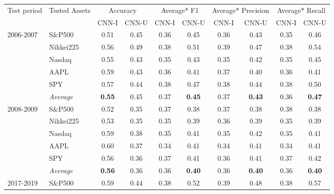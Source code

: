 \documentclass[11pt, a4paper]{article}
\begin{document}
\begin{table}[H]
\begin{tabular}{l|l|cc|cc|cc|cc}
\multicolumn{1}{m{1cm}|}{\multirow{2}{1cm}{Test period}} & \multicolumn{1}{m{1.5cm}|}{\multirow{2}{1.5cm}{Tested Assets}} & \multicolumn{2}{c|}{Accuracy} & \multicolumn{2}{c|}{Average* F1} & \multicolumn{2}{c|}{Average* Precision} & \multicolumn{2}{c}{Average* Recall}  \\
\cline{3-10}
&& CNN-I & CNN-U & CNN-I & CNN-U & CNN-I & CNN-U & CNN-I & CNN-U \\ \hline \hline
\multirow{6}{1cm}{2006-2007} & S\&P500          & 0.51          & 0.45 & 0.36 & 0.45          & 0.36 & 0.43          & 0.35 & 0.46          \\
& Nikkei225        & 0.56          & 0.49 & 0.38 & 0.51          & 0.39 & 0.47          & 0.38 & 0.54          \\
& Nasdaq           & 0.55          & 0.43 & 0.35 & 0.43          & 0.35 & 0.42          & 0.35 & 0.45          \\
& AAPL             & 0.59          & 0.43 & 0.36 & 0.41          & 0.37 & 0.40          & 0.36 & 0.41          \\
& SPY              & 0.57          & 0.44 & 0.38 & 0.47          & 0.38 & 0.44          & 0.38 & 0.50          \\ \cline{2-10}
& \textit{Average} & \textbf{0.55} & 0.45 & 0.37 & \textbf{0.45} & 0.37 & \textbf{0.43} & 0.36 & \textbf{0.47} \\ \hline
\multirow{6}{1cm}{2008-2009} & S\&P500          & 0.52          & 0.35 & 0.37 & 0.38          & 0.37 & 0.38          & 0.38 & 0.38          \\
          & Nikkei225        & 0.53          & 0.35 & 0.35 & 0.39          & 0.36 & 0.39          & 0.35 & 0.39          \\
          & Nasdaq           & 0.59          & 0.38 & 0.35 & 0.41          & 0.35 & 0.42          & 0.35 & 0.41          \\
          & AAPL             & 0.60          & 0.37 & 0.34 & 0.41          & 0.34 & 0.41          & 0.34 & 0.41          \\
          & SPY              & 0.56          & 0.36 & 0.37 & 0.41          & 0.36 & 0.41          & 0.37 & 0.42          \\ \cline{2-10} 
          & \textit{Average} & \textbf{0.56} & 0.36 & 0.36 & \textbf{0.40} & 0.36 & \textbf{0.40} & 0.36 & \textbf{0.40} \\ \hline
\multirow{6}{1cm}{2017-2019} & S\&P500          & 0.59          & 0.44 & 0.38 & 0.52          & 0.39 & 0.48          & 0.38 & 0.57          \\

\end{tabular}
\end{table}
\end{document}
